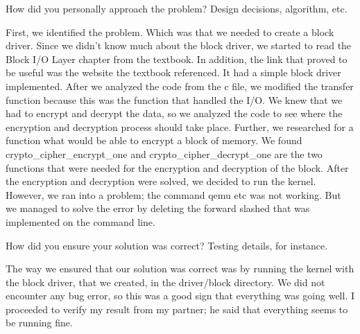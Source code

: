 \documentclass{article}
\newenvironment{question}[2][Question]{\begin{trivlist}
\item[\hskip \labelsep {\bfseries #1}\hskip \labelsep {\bfseries #2.}]}{\end{trivlist}}
\begin{document}

\vspace{0.25in} %

\begin{question}{2}
How did you personally approach the problem? Design decisions, algorithm, etc.
\end{question}
First, we identified the problem. Which was that we needed to create a block driver. Since we didn’t know much about the block driver, we started to read the Block I/O Layer chapter from the textbook. In addition, the link that proved to be useful was the website the textbook referenced. It had a simple block driver implemented. After we analyzed the code from the c file, we modified the transfer function because this was the function that handled the I/O. We knew that we had to encrypt and decrypt the data, so we analyzed the code to see where the encryption and decryption process should take place. Further, we researched for a function what would be able to encrypt a block of memory. We found crypto_cipher_encrypt_one and crypto_cipher_decrypt_one are the two functions that were needed for the encryption and decryption of the block. After the encryption and decryption were solved, we decided to run the kernel. However, we ran into a problem; the command qemu etc was not working. But we managed to solve the error by deleting the forward slashed that was implemented on the command line. 




\vspace{0.25in} %

\begin{question}{3}
How did you ensure your solution was correct? Testing details, for instance.
\end{question}
The way we ensured that our solution was correct was by running the kernel with the block driver, that we created, in the driver/block directory. We did not encounter any bug error, so this was a good sign that everything was going well. I proceeded to verify my result from my partner; he said that everything seems to be running fine.


\end{document}
